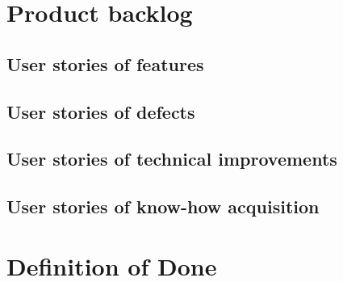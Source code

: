 \documentclass{article}
\begin{document}
\section{Product backlog}
\subsection{User stories of features}


\subsection{User stories of defects}
\subsection{User stories of technical improvements}

\subsection{User stories of know-how acquisition}


\section{Definition of Done}

\printglossaries

\end{document}
